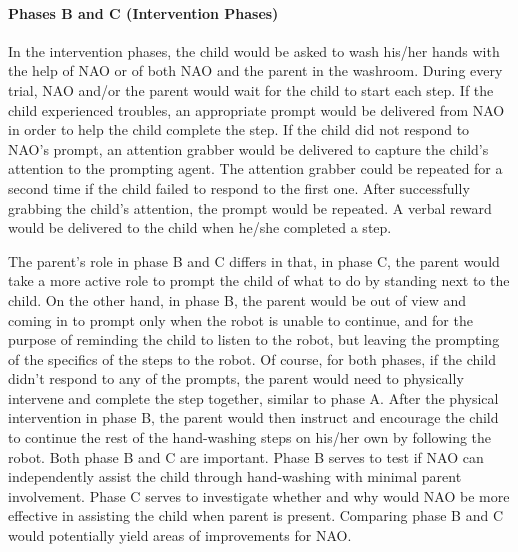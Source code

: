 \paragraph{Phases B and C (Intervention Phases)}
In the intervention phases, the child would be asked to wash his/her hands with the help of NAO or of both NAO and the parent in the washroom. During every trial, NAO and/or the parent would wait for the child to start each step. If the child experienced troubles, an appropriate prompt would be delivered from NAO in order to help the child complete the step. If the child did not respond to NAO's prompt, an attention grabber would be delivered to capture the child's attention to the prompting agent. The attention grabber could be repeated for a second time if the child failed to respond to the first one.  After successfully grabbing the child's attention, the prompt would be repeated.  A verbal reward would be delivered to the child when he/she completed a step.

The parent's role in phase B and C differs in that, in phase C, the parent would take a more active role to prompt the child of what to do by standing next to the child.  On the other hand, in phase B, the parent would be out of view and coming in to prompt only when the robot is unable to continue, and for the purpose of reminding the child to listen to the robot, but leaving the prompting of the specifics of the steps to the robot.  Of course, for both phases, if the child didn't respond to any of the prompts, the parent would need to physically intervene and complete the step together, similar to phase A.  After the physical intervention in phase B, the parent would then instruct and encourage the child to continue the rest of the hand-washing steps on his/her own by following the robot.  Both phase B and C are important.  Phase B serves to test if NAO can independently assist the child through hand-washing with minimal parent involvement.  Phase C serves to investigate whether and why would NAO be more effective in assisting the child when parent is present.  Comparing phase B and C would potentially yield areas of improvements for NAO.

